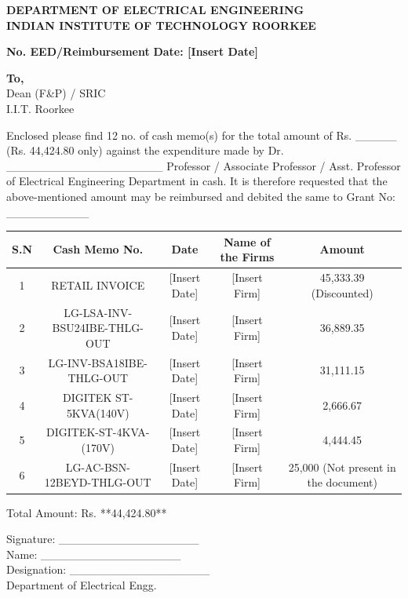 \documentclass[a4paper,12pt]{article}
\begin{document}
\begin{center}
    \textbf{DEPARTMENT OF ELECTRICAL ENGINEERING}\\
    \textbf{INDIAN INSTITUTE OF TECHNOLOGY ROORKEE}
\end{center}

\vspace{1cm}

\noindent
\textbf{No. EED/Reimbursement} \hfill \textbf{Date: [Insert Date]}

\vspace{0.5cm}

\noindent
\textbf{To,}\\
Dean (F\&P) / SRIC\\
I.I.T. Roorkee\\

\vspace{0.5cm}

\noindent
Enclosed please find 12 no. of cash memo(s) for the total amount of Rs. \_\_\_\_\_ (Rs. 
44,424.80 only) against the expenditure made by Dr.
\_\_\_\_\_\_\_\_\_\_\_\_\_\_\_\_\_\_\_ Professor / Associate Professor / Asst. Professor
of Electrical Engineering Department in cash. It is therefore requested that the above-mentioned
amount may be reimbursed and debited the same to Grant No: \_\_\_\_\_\_\_\_\_\_

\vspace{1cm}

\noindent
\begin{tabular}{|c|c|c|c|c|}
    \hline
    S.N & Cash Memo No. & Date & Name of the Firms & Amount \\
    \hline
    1 & RETAIL INVOICE & [Insert Date] & [Insert Firm] & 45,333.39 (Discounted)\\
    2 & LG-LSA-INV-BSU24IBE-THLG-OUT & [Insert Date] & [Insert Firm] & 36,889.35\\
    3 & LG-INV-BSA18IBE-THLG-OUT & [Insert Date] & [Insert Firm] & 31,111.15\\
    4 & DIGITEK ST-5KVA(140V) & [Insert Date] & [Insert Firm] & 2,666.67\\
    5 & DIGITEK-ST-4KVA-(170V) & [Insert Date] & [Insert Firm] & 4,444.45\\
    6 & LG-AC-BSN-12BEYD-THLG-OUT & [Insert Date] & [Insert Firm] & 25,000 (Not present in the document)\\
    \hline
\end{tabular}

\vspace{1cm}

\noindent
Total Amount: Rs. **44,424.80**

\vspace{1cm}

\noindent
Signature: \_\_\_\_\_\_\_\_\_\_\_\_\_\_\_\_\_\\
Name: \_\_\_\_\_\_\_\_\_\_\_\_\_\_\_\_\_\\
Designation: \_\_\_\_\_\_\_\_\_\_\_\_\_\_\_\_\_\\
Department of Electrical Engg.
\end{document}
